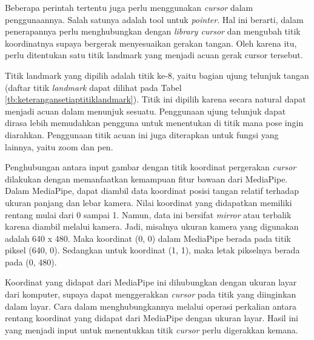  
Beberapa perintah tertentu juga perlu menggunakan \emph{cursor} dalam penggunaannya. Salah satunya adalah {tool} untuk \emph{pointer}. Hal ini berarti, dalam penerapannya perlu menghubungkan dengan \emph{library cursor} dan mengubah titik koordinatnya supaya bergerak menyesuaikan gerakan tangan. Oleh karena itu, perlu ditentukan satu titik landmark yang menjadi acuan gerak cursor tersebut. 

Titik landmark yang dipilih adalah titik ke-8, yaitu bagian ujung telunjuk tangan (daftar titik \emph{landmark} dapat dilihat pada Tabel \ref{tb:keterangansetiaptitiklandmark}). Titik ini dipilih karena secara natural dapat menjadi acuan dalam menunjuk sesuatu. Penggunaan ujung telunjuk dapat dirasa lebih memudahkan pengguna untuk menentukan di titik mana pose ingin diarahkan. Penggunaan titik acuan ini juga diterapkan untuk fungsi yang lainnya, yaitu zoom dan pen.

Penghubungan antara input gambar dengan titik koordinat pergerakan \emph{cursor} dilakukan dengan memanfaatkan kemampuan fitur bawaan dari MediaPipe. Dalam MediaPipe, dapat diambil data koordinat posisi tangan relatif terhadap ukuran panjang dan lebar kamera. Nilai koordinat yang didapatkan memiliki rentang mulai dari 0 sampai 1. Namun, data ini bersifat \emph{mirror} atau terbalik karena diambil melalui kamera. Jadi, misalnya ukuran kamera yang digunakan adalah 640 x 480. Maka koordinat (0, 0) dalam MediaPipe berada pada titik piksel (640, 0). Sedangkan untuk koordinat (1, 1), maka letak pikselnya berada pada (0, 480). 

Koordinat yang didapat dari MediaPipe ini dihubungkan dengan ukuran layar dari komputer, supaya dapat menggerakkan \emph{cursor} pada titik yang diinginkan dalam layar. Cara dalam menghubungkannya melalui operasi perkalian antara rentang koordinat yang didapat dari MediaPipe dengan ukuran layar. Hasil ini yang menjadi input untuk menentukkan titik \emph{cursor} perlu digerakkan kemana.


